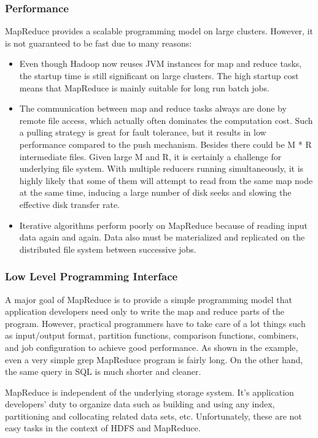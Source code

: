 \documentclass[12pt]{book}
\begin{document}
\subsubsection{Performance}
MapReduce provides a scalable programming model on large clusters. However, it is not guaranteed to be fast due to many reasons:
\begin{itemize}
\item Even though Hadoop now reuses JVM instances for map and reduce tasks, the startup time is still significant on large clusters. The high startup cost means that MapReduce is mainly suitable for long run batch jobs.
\item The communication between map and reduce tasks always are done by remote file access, which actually often dominates the computation cost. Such a pulling strategy is great for fault tolerance, but it results in low performance compared to the push mechanism. Besides there could be M * R intermediate files. Given large M and R, it is certainly a challenge for underlying file system. With multiple reducers running simultaneously, it is highly likely that some of them will attempt to read from the same map node at the same time, inducing a large number of disk seeks and slowing the effective disk transfer rate.
\item Iterative algorithms perform poorly on MapReduce because of reading input data again and again. Data also must be materialized and replicated on the distributed file system between successive jobs.
\end{itemize}
\subsubsection{Low Level Programming Interface}
A major goal of MapReduce is to provide a simple programming model that application developers need only to write the map and reduce parts of the program. However, practical programmers have to take care of a lot things such as input/output format, partition functions, comparison functions, combiners, and job configuration to achieve good performance. As shown in the example, even a very simple grep MapReduce program is fairly long. On the other hand, the same query in SQL is much shorter and cleaner.

MapReduce is independent of the underlying storage system. It's application developers' duty to organize data such as building and using any index, partitioning and collocating related data sets, etc. Unfortunately, these are not easy tasks in the context of HDFS and MapReduce.
\end{document}

